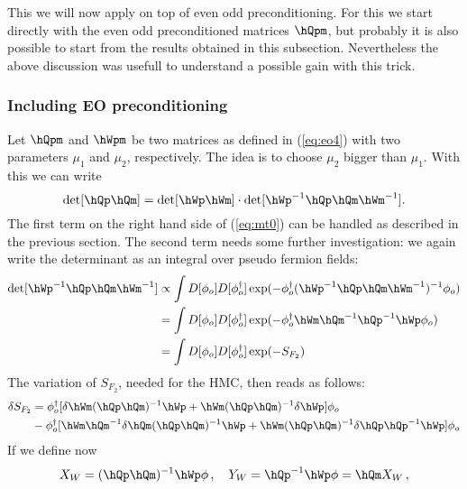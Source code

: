 This we will now apply on top of even odd preconditioning. For this we
start directly with the even odd preconditioned matrices $\hQpm$, but
probably it is also possible to start from the results obtained in
this subsection. Nevertheless the above discussion was usefull to
understand a possible gain with this trick.

\subsubsection{Including EO preconditioning}

Let $\hQpm$ and $\hWpm$ be two matrices as defined in (\ref{eq:eo4})
with two parameters $\mu_1$ and $\mu_2$, respectively. The idea is to
choose $\mu_2$ bigger than $\mu_1$. With this we can
write
\begin{equation}
  \label{eq:mt0}
  \det[\hQp\hQm] = \det[\hWp\hWm]\cdot\det[\hWp^{-1}\hQp\hQm\hWm^{-1}].
\end{equation}
The first term on the right hand side of (\ref{eq:mt0}) can be handled
as described in the previous section. The second term needs some
further investigation: we again write the determinant as an integral
over pseudo fermion fields:
\begin{equation}
  \label{eq:mt1}
  \begin{split}
    \det[\hWp^{-1}\hQp\hQm\hWm^{-1}]  &\propto \int
    D[\phi_o]D[\phi_o^\dagger]\exp(-\phi_o^\dagger (\hWp^{-1}\hQp\hQm\hWm^{-1})^{-1}
    \phi_o) \\
    &= \int D[\phi_o]D[\phi_o^\dagger]\exp(-\phi_o^\dagger \hWm\hQm^{-1}\hQp^{-1}\hWp\phi_o) \\
    &= \int D[\phi_o]D[\phi_o^\dagger]\exp(-S_{F_2})
  \end{split}
\end{equation}
The variation of $S_{F_2}$, needed for the HMC, then reads as follows:
\begin{equation}
  \label{eq:mt2}
  \begin{split}
    \delta S_{F_2} &= \phi_o^\dagger[\delta\hWm(\hQp\hQm)^{-1}\hWp
    +\hWm(\hQp\hQm)^{-1}\delta\hWp]\phi_o\\
    &-\phi_o^\dagger[\hWm\hQm^{-1}\delta\hQm(\hQp\hQm)^{-1}\hWp +
    \hWm(\hQp\hQm)^{-1}\delta\hQp\hQp^{-1}\hWp]\phi_o
  \end{split}
\end{equation}
If we define now
\begin{equation}
  \label{eq:mt3}
  X_W = (\hQp\hQm)^{-1}\hWp\phi\, ,\quad Y_W = \hQp^{-1}\hWp\phi = \hQm
  X_W\, ,
\end{equation}
